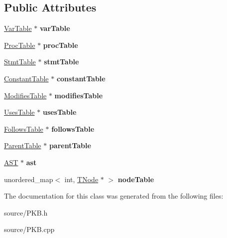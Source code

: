 \subsection*{Public Attributes}
\begin{DoxyCompactItemize}
\item 
\hypertarget{class_p_k_b_ac3fb1c4fc89ccee70b53768c56557052}{}\hyperlink{class_var_table}{Var\+Table} $\ast$ {\bfseries var\+Table}\label{class_p_k_b_ac3fb1c4fc89ccee70b53768c56557052}

\item 
\hypertarget{class_p_k_b_ab1749778e546e4965f3aa53beec4fab2}{}\hyperlink{class_proc_table}{Proc\+Table} $\ast$ {\bfseries proc\+Table}\label{class_p_k_b_ab1749778e546e4965f3aa53beec4fab2}

\item 
\hypertarget{class_p_k_b_a393ce116950905f2f09f011ca53dd4c8}{}\hyperlink{class_stmt_table}{Stmt\+Table} $\ast$ {\bfseries stmt\+Table}\label{class_p_k_b_a393ce116950905f2f09f011ca53dd4c8}

\item 
\hypertarget{class_p_k_b_a86534b4efd10fb4c0f041810511f6ad5}{}\hyperlink{class_constant_table}{Constant\+Table} $\ast$ {\bfseries constant\+Table}\label{class_p_k_b_a86534b4efd10fb4c0f041810511f6ad5}

\item 
\hypertarget{class_p_k_b_a865a4c2354d06e86e7e0123504d70efb}{}\hyperlink{class_modifies_table}{Modifies\+Table} $\ast$ {\bfseries modifies\+Table}\label{class_p_k_b_a865a4c2354d06e86e7e0123504d70efb}

\item 
\hypertarget{class_p_k_b_ae04313707aeeccf9697e7002e1895288}{}\hyperlink{class_uses_table}{Uses\+Table} $\ast$ {\bfseries uses\+Table}\label{class_p_k_b_ae04313707aeeccf9697e7002e1895288}

\item 
\hypertarget{class_p_k_b_ad1d0ea0caa5aea23c847fdb6b46dba6d}{}\hyperlink{class_follows_table}{Follows\+Table} $\ast$ {\bfseries follows\+Table}\label{class_p_k_b_ad1d0ea0caa5aea23c847fdb6b46dba6d}

\item 
\hypertarget{class_p_k_b_a518af23a1669d8d20b18ca3327febdb0}{}\hyperlink{class_parent_table}{Parent\+Table} $\ast$ {\bfseries parent\+Table}\label{class_p_k_b_a518af23a1669d8d20b18ca3327febdb0}

\item 
\hypertarget{class_p_k_b_a67f42d345eff2c10725c2121ed1a5789}{}\hyperlink{class_a_s_t}{A\+S\+T} $\ast$ {\bfseries ast}\label{class_p_k_b_a67f42d345eff2c10725c2121ed1a5789}

\item 
\hypertarget{class_p_k_b_a03ab425e8425299d1400dd823e80a0fc}{}unordered\+\_\+map$<$ int, \hyperlink{class_t_node}{T\+Node} $\ast$ $>$ {\bfseries node\+Table}\label{class_p_k_b_a03ab425e8425299d1400dd823e80a0fc}

\end{DoxyCompactItemize}


The documentation for this class was generated from the following files\+:\begin{DoxyCompactItemize}
\item 
source/P\+K\+B.\+h\item 
source/P\+K\+B.\+cpp\end{DoxyCompactItemize}
